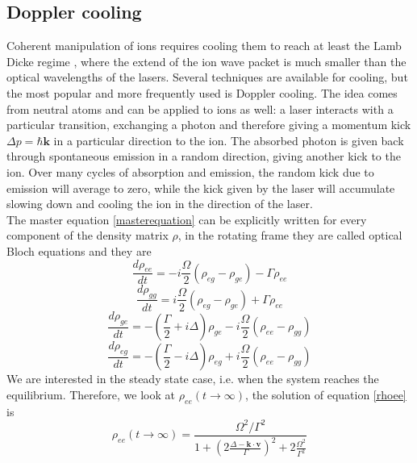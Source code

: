 \subsection{Doppler cooling}
\label{sec:doppler_cooling}
Coherent manipulation of ions requires cooling them to reach at least the Lamb Dicke regime \cite{Wineland1998}, where the extend of the ion wave packet is much smaller than the optical wavelengths of the lasers. Several techniques are available for cooling, but the most popular and more frequently used is Doppler cooling. The idea comes from neutral atoms \cite{1975OptCo..13...68H} and can be applied to ions as well: a laser interacts with a particular transition, exchanging a photon and therefore giving a momentum kick $\Delta p = \hbar \mathbf{k}$ in a particular direction to the ion. The absorbed photon is given back through spontaneous emission in a random direction, giving another kick to the ion. Over many cycles of absorption and emission, the random kick due to emission will average to zero, while the kick given by the laser will accumulate slowing down and cooling the ion in the direction of the laser. \\
The master equation \eqref{masterequation} can be explicitly written for every component of the density matrix $\rho$, in the rotating frame they are called optical Bloch equations and they are
\begin{equation}
\label{rhoee}
\frac{d\rho_{ee}}{dt} = -i\frac{\Omega}{2}(\rho_{eg} - \rho_{ge}) - \Gamma \rho_{ee}
\end{equation}
\begin{equation}
\frac{d\rho_{gg}}{dt} = i\frac{\Omega}{2}(\rho_{eg} - \rho_{ge}) + \Gamma \rho_{ee}
\end{equation}
\begin{equation}
\frac{d\rho_{ge}}{dt} = -\left(\frac{\Gamma}{2}+i\Delta\right)\rho_{ge} -i\frac{\Omega}{2}(\rho_{ee} - \rho_{gg})
\end{equation}
\begin{equation}
\frac{d\rho_{eg}}{dt} = -\left(\frac{\Gamma}{2}-i\Delta\right)\rho_{eg}+i\frac{\Omega}{2}(\rho_{ee} - \rho_{gg})
\end{equation}
We are interested in the steady state case, i.e. when the system reaches the equilibrium. Therefore, we look at $\rho_{ee}(t\to \infty) $, the solution of equation \eqref{rhoee} is
\begin{equation}
\rho_{ee}(t\to \infty) = \frac{\Omega^2/\Gamma^2}{1 + \left(2\frac{\Delta -\mathbf{k}\cdot \mathbf{v}}{\Gamma}\right)^2 + 2\frac{\Omega^2}{\Gamma^2}}
\end{equation}
